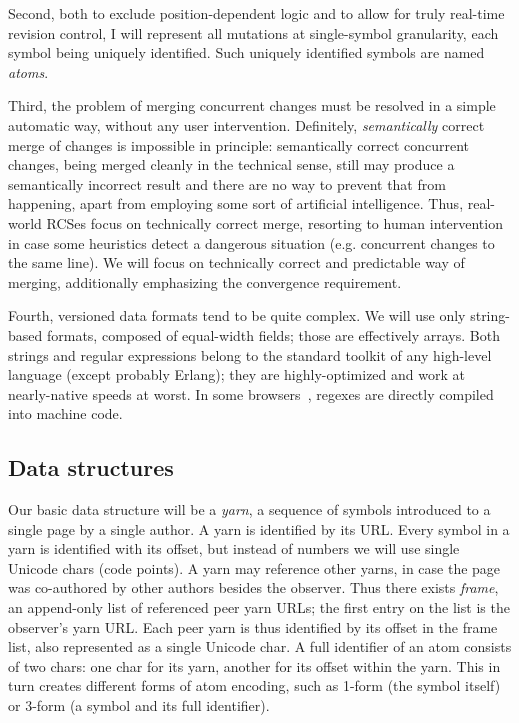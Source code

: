 \documentclass{acm_proc_article-sp}
\begin{document}
Second, both to exclude position-dependent logic and to allow for truly real-time revision control, I will represent all mutations at single-symbol granularity, each symbol being uniquely identified.
Such uniquely identified symbols are named \emph{atoms}.

Third, the problem of merging concurrent changes must
be resolved in a simple automatic way, without any user
intervention. Definitely,
\emph{semantically} correct merge of changes is impossible
in principle: semantically correct concurrent
changes, being merged cleanly in
the technical sense, still may produce a semantically
incorrect result and there are no way to prevent that
from happening,
apart from employing some sort of artificial
intelligence. Thus, real-world RCSes focus on technically
correct merge, resorting to human intervention in case
some heuristics detect a dangerous situation (e.g.
concurrent changes to the same line).
We will focus on technically correct and predictable way
of merging, additionally emphasizing the convergence
requirement.

Fourth, versioned data formats tend to be quite complex.
We will use only string-based formats, composed of equal-width fields; those are effectively arrays.
Both strings and regular expressions belong to the standard toolkit of any high-level language (except probably Erlang); they are highly-optimized and work at nearly-native speeds at worst.
In some browsers~\cite{wrec,irregex}, regexes are directly compiled into machine code.

\subsection{Data structures}

\newcommand{\aum}{{\fontspec{Devanagari MT}\selectfont ॐ}}
\newcommand{\eoa}{{\fontspec{Geeza Pro}\selectfont ۝}}
\newcommand{\bsp}{{\fontspec{Apple Symbols} ⌫}}
\newcommand{\cnc}{{\fontspec{Apple Symbols} ⌦}}
\newcommand{\zero}{{\fontspec{Apple Symbols} ⌀}}

Our basic data structure will be a \emph{yarn}, a sequence of symbols introduced to a single page by a single author.
A yarn is identified by its URL.
Every symbol in a yarn is identified with its offset, but instead of numbers we will use single Unicode chars (code points).
A yarn may reference other yarns, in case the page was co-authored by other authors besides the observer.
Thus there exists \emph{frame}, an append-only list of referenced peer yarn URLs; the first entry on the list is the observer's yarn URL.
Each peer yarn is thus identified by its offset in the frame list, also represented as a single Unicode char.
A full identifier of an atom consists of two chars: one char for its yarn, another for its offset within the yarn.
This in turn creates different forms of atom encoding, such as 1-form (the symbol itself) or 3-form (a symbol and its full identifier).
\end{document}
